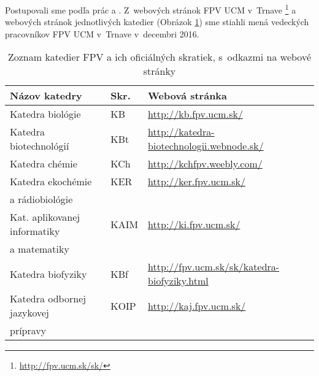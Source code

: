   Postupovali sme podľa prác \citet{Kazakis2014a} a
  \citet{Kazakis2014b,Kazakis2015}.  Z~webových stránok FPV UCM v~Trnave
  \footnote{\url{http://fpv.ucm.sk/sk/}} a webových stránok jednotlivých katedier
  (Obrázok \ref{tab:department.review}) sme stiahli mená vedeckých pracovníkov FPV UCM v~Trnave
  v~decembri 2016.

  \begin{table}
  \centering\small
  \caption[Zoznam katedier FPV]{Zoznam katedier FPV a ich oficiálných skratiek, s~odkazmi na webové stránky}
  \label{tab:department.review}
  \begin{tabularx}{\textwidth}{lll}
    \toprule\noalign{\vspace{.3ex}}
    Názov katedry                   & Skr.    & Webová stránka\\[0.3ex]
    \midrule\noalign{\vspace{.5ex}}
    Katedra biológie                & KB      & {\footnotesize \url{http://kb.fpv.ucm.sk/}} \\[0.5ex]
    Katedra biotechnológií          & KBt     & {\footnotesize \url{http://katedra-biotechnologii.webnode.sk/}}\\[0.5ex]
    Katedra chémie                  & KCh     & {\footnotesize \url{http://kchfpv.weebly.com/}} \\[0.5ex]
    Katedra ekochémie               & KER     & {\footnotesize \url{http://ker.fpv.ucm.sk/}} \\[-0.25ex]
    a rádiobiológie                 &         &                                             \\ [0.5ex]
    Kat. aplikovanej informatiky    & KAIM    & {\footnotesize \url{http://ki.fpv.ucm.sk/}} \\[-0.25ex]
    a matematiky                    &         &                                              \\[0.5ex]
    Katedra biofyziky               & KBf     & {\footnotesize \url{http://fpv.ucm.sk/sk/katedra-biofyziky.html}} \\[0.5ex]
    Katedra odbornej jazykovej      & KOIP    & {\footnotesize \url{http://kaj.fpv.ucm.sk/}} \\[-0.25ex]
    prípravy                        &         &                                              \\[0.5ex]
    \bottomrule
  \end{tabularx}
  \end{table}

